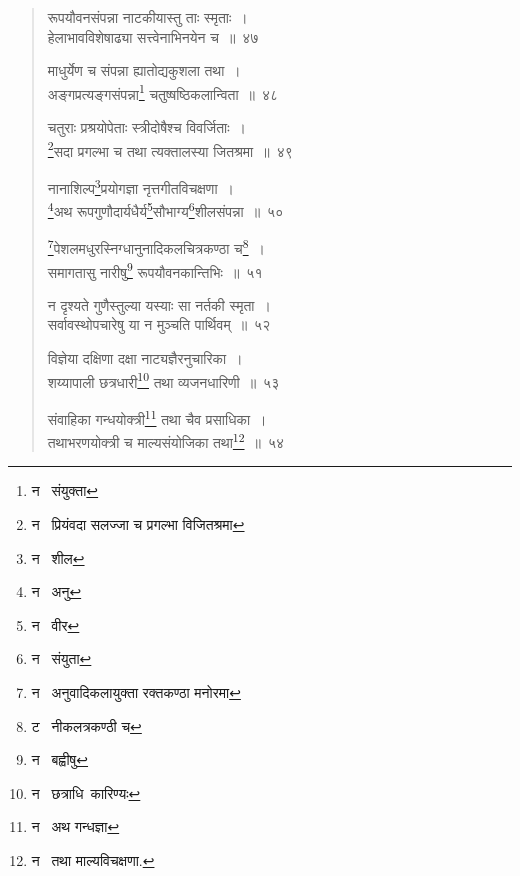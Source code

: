 \documentclass[11pt, openany]{book}
\begin{document}
\begin{quote}
{\na रूपयौवनसंपन्ना नाटकीयास्तु ताः स्मृताः~।\\
हेलाभावविशेषाढ्या सत्त्वेनाभिनयेन च~॥~४७

माधुर्येण च संपन्ना ह्यातोद्यकुशला तथा~।\\
अङ्गप्रत्यङ्गसंपन्ना\renewcommand{\thefootnote}{1}\footnote{न \textendash\  संयुक्ता} चतुष्षष्ठिकलान्विता~॥~४८

चतुराः प्रश्रयोपेताः स्त्रीदोषैश्च विवर्जिताः~।\\
\renewcommand{\thefootnote}{2}\footnote{न \textendash\  प्रियंवदा सलज्जा च प्रगल्भा विजितश्रमा}सदा प्रगल्भा च तथा त्यक्तालस्या जितश्रमा~॥~४९

नानाशिल्प\renewcommand{\thefootnote}{3}\footnote{न \textendash\  शील}प्रयोगज्ञा नृत्तगीतविचक्षणा~।\\
\renewcommand{\thefootnote}{4}\footnote{न \textendash\  अनु}अथ रूपगुणौदार्यधैर्य\renewcommand{\thefootnote}{5}\footnote{न \textendash\  वीर}सौभाग्य\renewcommand{\thefootnote}{6}\footnote{न \textendash\  संयुता}शीलसंपन्ना~॥~५०

\renewcommand{\thefootnote}{7}\footnote{न \textendash\  अनुवादिकलायुक्ता रक्तकण्ठा मनोरमा}पेशलमधुरस्निग्धानुनादिकलचित्रकण्ठा च\renewcommand{\thefootnote}{8}\footnote{ट \textendash\  नीकलत्रकण्ठी च}~।\\
समागतासु नारीषु\renewcommand{\thefootnote}{9}\footnote{न \textendash\  बह्वीषु} रूपयौवनकान्तिभिः~॥~५१

न दृश्यते गुणैस्तुल्या यस्याः सा नर्तकी स्मृता~।\\
सर्वावस्थोपचारेषु या न मुञ्चति पार्थिवम्~॥~५२

विज्ञेया दक्षिणा दक्षा नाट्यज्ञैरनुचारिका~।\\
शय्यापाली छत्रधारी\renewcommand{\thefootnote}{10}\footnote{न \textendash\  छत्राधि\textendash\  कारिण्यः} तथा व्यजनधारिणी~॥~५३

संवाहिका गन्धयोक्त्री\renewcommand{\thefootnote}{11}\footnote{न \textendash\  अथ गन्धज्ञा} तथा चैव प्रसाधिका~।\\
तथाभरणयोक्त्री च माल्यसंयोजिका तथा\renewcommand{\thefootnote}{12}\footnote{न \textendash\  तथा माल्यविचक्षणा.}~॥~५४}
\end{quote}

\newpage
\end{document}
